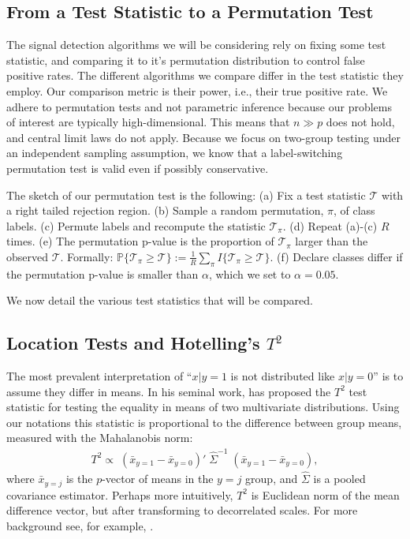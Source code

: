 \documentclass[12pt,a4paper]{article}
\begin{document}
\subsection{From a Test Statistic to a Permutation Test}

The signal detection algorithms we will be considering rely on fixing some test statistic, and comparing it to it's permutation distribution to control false positive rates. 
The different algorithms we compare differ in the test statistic they employ.
Our comparison metric is their power, i.e., their true positive rate. 
We adhere to permutation tests and not parametric inference because our problems of interest are typically high-dimensional. 
This means that $n \gg p$ does not hold, and central limit laws do not apply.
Because we focus on two-group testing under an independent sampling assumption, we know that a label-switching permutation test is valid even if possibly conservative. 

The sketch of our permutation test is the following: \newline
(a) Fix a test statistic $\mathcal{T}$ with a right tailed rejection region. \newline
(b) Sample a random permutation, $\pi$, of class labels. \newline
(c) Permute labels and recompute the statistic $\mathcal{T}_\pi$. \newline
(d) Repeat (a)-(c) $R$ times. \newline
(e) The permutation p-value is the proportion of  $\mathcal{T}_\pi$ larger than the observed $\mathcal{T}$. Formally: 
$\mathbb{P}\{\mathcal{T}_\pi \geq \mathcal{T}\}:=\frac{1}{R} \sum_{\pi} I\{\mathcal{T}_\pi \geq \mathcal{T}\}$.\newline
(f) Declare classes differ if the permutation p-value is smaller than $\alpha$, which we set to $\alpha=0.05$.
\bigskip

We now detail the various test statistics that will be compared.


\subsection{Location Tests and Hotelling's $T^2$}
The most prevalent interpretation of ``$x|y=1$ is not distributed like $x|y=0$'' is to assume they differ in means. 
In his seminal work, \citet{hotelling_generalization_1931} has proposed the $T^2$ test statistic for testing the equality in means of two multivariate distributions. 
Using our notations this statistic is proportional to the difference between group means, measured with the Mahalanobis norm: 
\begin{align}
	T^2 \propto \; (\bar{x}_{y=1}-\bar{x}_{y=0})'\; \hat{\Sigma}^{-1} \;(\bar{x}_{y=1}-\bar{x}_{y=0}), 
\end{align}
where $\bar{x}_{y=j}$ is the $p$-vector of means in the $y=j$ group, and $\hat{\Sigma}$ is a pooled covariance estimator.
Perhaps more intuitively, $T^2$ is Euclidean norm of the mean difference vector, but after transforming to decorrelated scales. 
For more background see, for example, \cite{anderson_introduction_2003}.
\end{document}
